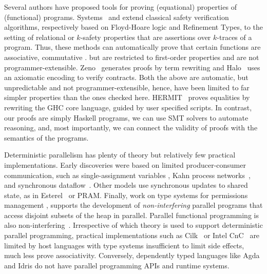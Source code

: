 %
Several authors have proposed tools for proving
(equational) properties of (functional) programs.
%
Systems~\citep{sousa16} and \citep{KobayashiRelational15}
extend classical safety verification algorithms,
respectively based on Floyd-Hoare logic and Refinement Types,
to the setting of relational or $k$-safety properties
that are assertions over $k$-traces of a program.
%
Thus, these methods can automatically prove that
certain functions are associative, commutative \etc.
but are restricted to first-order properties and
are not programmer-extensible.
%
Zeno~\citep{ZENO} generates proofs by term
rewriting and Halo~\citep{halo} uses an axiomatic
encoding to verify contracts.
%
Both the above are automatic, but unpredictable and not
programmer-extensible, hence, have been limited to
far simpler properties than the ones checked here.
%
HERMIT~\citep{Farmer15} proves equalities by rewriting
the GHC core language, guided by user specified scripts.
%
In contrast, our proofs are simply Haskell programs,
we can use SMT solvers to automate reasoning, and,
most importantly, we can connect the validity of
proofs with the semantics of the programs.

%
%

%
Deterministic parallelism has plenty of theory but relatively few practical
implementations.  Early discoveries were based on limited producer-consumer
communication, such as single-assignment variables \cite{Tesler-1968,IStructures}, Kahn
process networks~\cite{kahn-1974}, and synchronous dataflow~\cite{lee-sdf}.
Other models use synchronous updates to shared state, as in
Esterel~\cite{synchronous-overview} or PRAM.  Finally, work on type systems for
permissions management \cite{permission-types,habanero-java-permissions},
supports the development of {\em non-interfering} parallel programs that access
disjoint subsets of the heap in parallel.  Parallel functional programming is
also non-interfering~\cite{manticore,multicore-ghc}.
%
Irrespective of which theory is used to support deterministic parallel
programming, practical implementations such as Cilk~\cite{cilk} or Intel
CnC~\cite{cnc} are limited by host languages with type systems insufficient to
limit side effects, much less prove associativity.  Conversely, dependently
typed languages like Agda and Idris do not have parallel programming APIs and
runtime systems.




